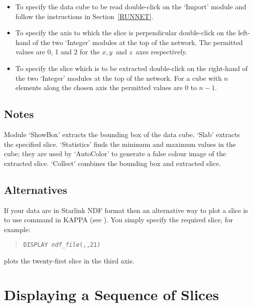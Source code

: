 \begin{itemize}

  \item To specify the data cube to be read double-click on the `Import'
   module and follow the instructions in Section~\ref{RUNNET}.

  \item To specify the axis to which the slice is perpendicular
   double-click on the left-hand of the two `Integer' modules at the
   top of the network. The permitted values are 0, 1 and 2 for the
   $x, y$\, and  $z$\, axes respectively.

  \item To specify the slice which is to be extracted double-click on
   the right-hand of the two `Integer' modules at the top of the
   network. For a cube with $n$\, elements along the chosen axis the
   permitted values are 0 to $n-1$.

\end{itemize}

\subsection{Notes}

Module `ShowBox' extracts the bounding box of the data cube. `Slab'
extracts the specified slice. `Statistics' finds the minimum and
maximum values in the cube; they are used by `AutoColor' to generate
a false colour image of the extracted slice. `Collect' combines the 
bounding box and extracted slice.

\subsection{Alternatives}

If your data are in Starlink NDF format then an alternative way to
plot a slice is to use command  in KAPPA 
(see \cite{SUN95}).  You simply specify the required
slice, for example:

\begin{quote}
{\tt DISPLAY~{\it ndf\_file}(,,21)}
\end{quote}

plots the twenty-first slice in the third axis.

\newpage
\section{Displaying a Sequence of Slices}


